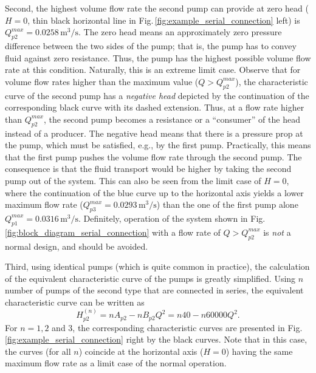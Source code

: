 Second, the highest volume flow rate the second pump can provide at zero head ($H=0$, thin black horizontal line in Fig.\,\ref{fig:example_serial_connection} left) is $Q_{p2}^{max}=0.0258\,\mathrm{m^3/s}$. The zero head means an approximately zero pressure difference between the two sides of the pump; that is, the pump has to convey fluid against zero resistance. Thus, the pump has the highest possible volume flow rate at this condition. Naturally, this is an extreme limit case. Observe that for volume flow rates higher than the maximum value ($Q>Q_{p2}^{max}$), the characteristic curve of the second pump has a \textit{negative head} depicted by the continuation of the corresponding black curve with its dashed extension. Thus, at a flow rate higher than $Q_{p2}^{max}$, the second pump becomes a resistance or a ``consumer'' of the head instead of a producer. The negative head means that there is a pressure prop at the pump, which must be satisfied, e.g., by the first pump. Practically, this means that the first pump pushes the volume flow rate through the second pump. The consequence is that the fluid transport would be higher by taking the second pump out of the system. This can also be seen from the limit case of $H=0$, where the continuation of the blue curve up to the horizontal axis yields a lower maximum flow rate ($Q_{p3}^{max}=0.0293\,\mathrm{m^3/s}$) than the one of the first pump alone $Q_{p1}^{max}=0.0316\,\mathrm{m^3/s}$. Definitely, operation of the system shown in Fig.\,\ref{fig:block_diagram_serial_connection} with a flow rate of $Q>Q_{p2}^{max}$ is \textit{not} a normal design, and should be avoided.

Third, using identical pumps (which is quite common in practice), the calculation of the equivalent characteristic curve of the pumps is greatly simplified. Using $n$ number of pumps of the second type that are connected in series, the equivalent characteristic curve can be written as
%
\begin{equation}
H_{p2}^{(n)} = n A_{p2} - n B_{p2} Q^2 = n 40 - n 60000 Q^2.
\end{equation}
%
For $n=1,2$ and $3$, the corresponding characteristic curves are presented in Fig.\,\ref{fig:example_serial_connection} right by the black curves. Note that in this case, the curves (for all $n$) coincide at the horizontal axis ($H=0$) having the same maximum flow rate as a limit case of the normal operation.

